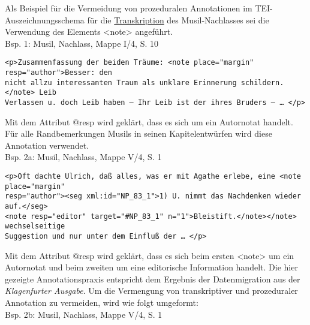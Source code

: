 \documentclass{article}
\begin{document}
        Als Beispiel für die Vermeidung von prozeduralen Annotationen im
                  TEI-Auszeichnungsschema für die \href{http://gams.uni-graz.at/o:konde.197}{Transkription} des Musil-Nachlasses sei die Verwendung des Elements
                     <note> angeführt.\\
            
        Bsp. 1: Musil, Nachlass, Mappe I/4, S. 10\\
            
        \begin{verbatim}<p>Zusammenfassung der beiden Träume: <note place="margin" resp="author">Besser: den 
nicht allzu interessanten Traum als unklare Erinnerung schildern.</note> Leib 
Verlassen u. doch Leib haben – Ihr Leib ist der ihres Bruders – … </p>\end{verbatim}Mit dem Attribut @resp wird geklärt, dass es sich um ein Autornotat handelt. Für alle
                  Randbemerkungen Musils in seinen Kapitelentwürfen wird diese Annotation
                  verwendet.\\
            
        Bsp. 2a: Musil, Nachlass, Mappe V/4, S. 1\\
            
        \begin{verbatim}<p>Oft dachte Ulrich, daß alles, was er mit Agathe erlebe, eine <note place="margin" 
resp="author"><seg xml:id="NP_83_1">1) U. nimmt das Nachdenken wieder auf.</seg>
<note resp="editor" target="#NP_83_1" n="1">Bleistift.</note></note> wechselseitige
Suggestion und nur unter dem Einfluß der … </p>\end{verbatim}Mit dem Attribut @resp wird geklärt, dass es sich beim ersten <note>
                  um ein Autornotat und beim zweiten um eine editorische Information handelt. Die
                  hier gezeigte Annotationspraxis entspricht dem Ergebnis der Datenmigration aus der
                     \emph{Klagenfurter Ausgabe}. Um die Vermengung von
                  transkriptiver und prozeduraler Annotation zu vermeiden, wird wie folgt
                  umgeformt:\\
            
        Bsp. 2b: Musil, Nachlass, Mappe V/4, S. 1\\
            
\end{document}
